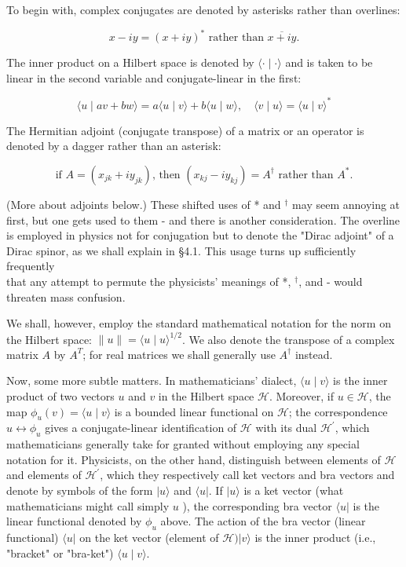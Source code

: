 \documentclass[10pt, letterpaper]{article}
\begin{document}
To begin with, complex conjugates are denoted by asterisks rather than overlines:

$$
x-i y=(x+i y)^{*} \text { rather than } \overline{x+i y} .
$$

The inner product on a Hilbert space is denoted by $\langle\cdot \mid \cdot\rangle$ and is taken to be linear in the second variable and conjugate-linear in the first:

$$
\langle u \mid a v+b w\rangle=a\langle u \mid v\rangle+b\langle u \mid w\rangle, \quad\langle v \mid u\rangle=\langle u \mid v\rangle^{*}
$$

The Hermitian adjoint (conjugate transpose) of a matrix or an operator is denoted by a dagger rather than an asterisk:

$$
\text { if } A=\left(x_{j k}+i y_{j k}\right) \text {, then }\left(x_{k j}-i y_{k j}\right)=A^{\dagger} \text { rather than } A^{*} \text {. }
$$

(More about adjoints below.) These shifted uses of * and ${ }^{\dagger}$ may seem annoying at first, but one gets used to them - and there is another consideration. The overline is employed in physics not for conjugation but to denote the "Dirac adjoint" of a Dirac spinor, as we shall explain in §4.1. This usage turns up sufficiently frequently\\
that any attempt to permute the physicists' meanings of *, ${ }^{\dagger}$, and - would threaten mass confusion.

We shall, however, employ the standard mathematical notation for the norm on the Hilbert space: $\|u\|=\langle u \mid u\rangle^{1 / 2}$. We also denote the transpose of a complex matrix $A$ by $A^{T}$; for real matrices we shall generally use $A^{\dagger}$ instead.

Now, some more subtle matters. In mathematicians' dialect, $\langle u \mid v\rangle$ is the inner product of two vectors $u$ and $v$ in the Hilbert space $\mathcal{H}$. Moreover, if $u \in \mathcal{H}$, the map $\phi_{u}(v)=\langle u \mid v\rangle$ is a bounded linear functional on $\mathcal{H}$; the correspondence $u \leftrightarrow \phi_{u}$ gives a conjugate-linear identification of $\mathcal{H}$ with its dual $\mathcal{H}^{\prime}$, which mathematicians generally take for granted without employing any special notation for it. Physicists, on the other hand, distinguish between elements of $\mathcal{H}$ and elements of $\mathcal{H}^{\prime}$, which they respectively call ket vectors and bra vectors and denote by symbols of the form $|u\rangle$ and $\langle u|$. If $|u\rangle$ is a ket vector (what mathematicians might call simply $u$ ), the corresponding bra vector $\langle u|$ is the linear functional denoted by $\phi_{u}$ above. The action of the bra vector (linear functional) $\langle u|$ on the ket vector (element of $\mathcal{H})|v\rangle$ is the inner product (i.e., "bracket" or "bra-ket") $\langle u \mid v\rangle$.
\end{document}
